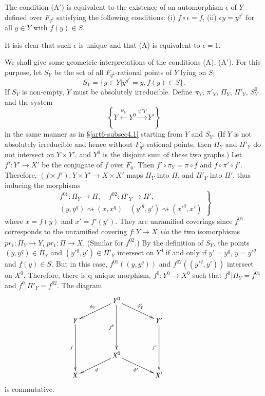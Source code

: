 \begin{subprop}\label{art6-subprop4.2.1}
The condition (A$'$) is equivalent to the existence of an automorphism $\epsilon$ of $Y$ defined over $F_{q^2}$ satisfying the following conditions: (i) $f \circ \epsilon = f$, (ii) $\epsilon y = y^{q^2}$ for all $y \in Y$ with $f(y) \in S$.
\end{subprop}

It is\pageoriginale is clear that such $\epsilon$ is unique and that (A) is equivalent to $\epsilon =1$.

We shall give some geometric interpretations of the conditions (A), (A$'$). For this purpose, let $S_Y$ be the set of all $F_{q^2}$-rational points of $Y$ lying on $S$;
$$
S_Y = \{y \in Y | y^{q^2} = y, f (y) \in S\}.
$$
If $S_Y$ is non-empty, $Y$ must be absolutely irreducible. Define $\pi_Y$, $\pi'_Y$, $\Pi_Y$, $\Pi'_Y$, $S^0_Y$ and the system
\setcounter{equation}{1}
\begin{equation}
\left\{Y \xleftarrow{\psi_Y} Y^0 \xrightarrow{\psi' Y} Y' \right\}
\label{art6-eq4.2.2}
\end{equation}
in the same manner as in \S \ref{art6-subsec4.1} starting from $Y$ and $S_Y$. (If $Y$ is not absolutely irreducible and hence without $F_{q^2}$-rational points, then $\Pi_Y$ and $\Pi'_Y$ do not intersect on $Y \times Y'$, and $Y^0$ is the disjoint sum of these two graphs.) Let $f' : Y' \longrightarrow X'$ be the conjugate of $f$ over $F_q$. Then $f' \circ \pi_Y = \pi \circ f$ and $f \circ \pi' \circ f'$. Therefore, $(f \times f') : Y \times Y' \to  X \times X'$ maps $\Pi_Y$ into $\Pi$, and $\Pi'_Y$ into $\Pi'$, thus inducing the morphisms
\begin{equation}
\left.
\begin{array}{c}
f^{01} : \Pi_Y \to \Pi, \quad f^{02} : \Pi'_Y \to \Pi',\\
(y, y^q) \rightsquigarrow (x, x^q) \quad (y'^q, y') \rightsquigarrow (x'^q, x')
\end{array}
\right\}
\label{art6-eq4.2.3}
\end{equation}
where $x = f(y)$ and $x' = f'(y')$. They are unramified coverings since $f^{01}$ corresponds to the unramified covering $f: Y \to X$ \textit{via} the two isomorphisms $pr_1 : \Pi_Y \tilde{\longrightarrow} Y$, $pr_1 : \Pi \tilde{\longrightarrow} X$. (Similar for $f^{02}$.) By the definition of $S_Y$, the points $(y, y^q) \in \Pi_Y$ and $(y'^q, y') \in \Pi'_Y$ intersect on $Y^0$ if and only if $y' = y^q$, $y = y'^q$ and $f(y) \in S$. But in this case, $f^{01} ((y, y^q))$ and $f^{02} ((y'^q, y'))$ intersect on $X^0$. Therefore, there is q unique morphism, $f^0: Y^0 \to X^0$ such that $f^0 | \Pi_Y = f^{01}$ and $f^0| \Pi'_Y = f^{02}$. The diagram
\begin{equation}
\vcenter{
\xymatrix@R=0.5cm@C=1.5cm{
& Y^0 \ar[dr]^-{\psi'_Y} \ar[dl]_-{\psi_Y} \ar[ddd]_-{f^0} & \\
Y \ar[ddd]_-f && Y' \ar[ddd]_-{f'}\\
& & &\\
& X^0 \ar[dr]_-{\psi'}  \ar[dl]^-{\psi} & \\
X & & X'}
}\label{art6-eq4.2.4}
\end{equation}
is commutative.

